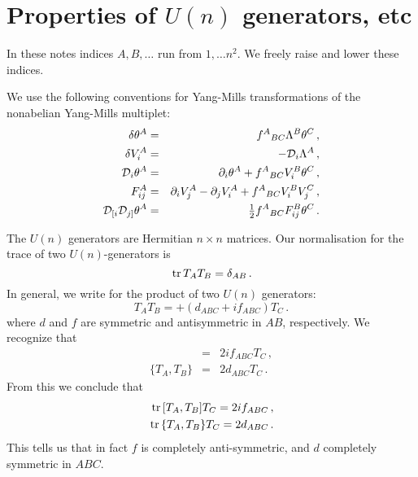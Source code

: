\documentclass[12pt,a4paper]{article}
\def\half{{\textstyle {1 \over 2}}}
\def\Dpartial{{\cal D}}
\def\tr{\,{\rm tr}\,}
\begin{document}
\appendix

\section{Properties of $U(n)$ generators, etc\label{AppUn}}

In these notes indices $A,B,\ldots$ run from $1,\ldots n^2$.
We freely raise and lower these indices.

We use the following conventions for Yang-Mills transformations of
the nonabelian Yang-Mills multiplet:
\begin{eqnarray}
   \delta\theta^A &=& f^A{}_{BC} \Lambda^B\theta^C\,,
   \\
   \delta V_i^A &=& -\Dpartial_i\Lambda^A\,,
   \\
   \Dpartial_i\theta^A &=& \partial_i\theta^A + f^A{}_{BC}V_i^B\theta^C\,,
   \\
   F_{ij}^A &=& \partial_iV_j^A-\partial_jV_i^A
     +f^A{}_{BC}V_i^BV_j^C\,,
    \\
   \Dpartial_{[i}\Dpartial_{j]}\theta^A
     &=& \half f^A{}_{BC} F_{ij}^B\theta^C\,.
\end{eqnarray}

The $U(n)$ generators are Hermitian $n\times n$ matrices.
Our normalisation for the trace of two $U(n)$-generators is
\begin{equation}
  \tr T_AT_B = \delta_{AB}\,.
\end{equation}
In general, we write for the product of two $U(n)$ generators:
\begin{equation}
  T_AT_B =  + (d_{ABC} + if_{ABC})T_C\,.
\end{equation}
where $d$ and $f$ are symmetric and antisymmetric in $AB$, respectively.
We recognize that
\begin{eqnarray}
  [T_A,T_B] &=& 2if_{ABC}T_C\,,\nonumber\\
  \{T_A,T_B\} &=& 2d_{ABC}T_C\,.
\end{eqnarray}
{From} this we conclude that
\begin{eqnarray}
  \tr [T_A,T_B]T_C = 2if_{ABC}\,,\nonumber\\
  \tr \{T_A,T_B\}T_C = 2d_{ABC}\,.
\end{eqnarray}
This tells us that in fact $f$ is completely anti-symmetric, and $d$
completely symmetric in $ABC$.
\end{document}
